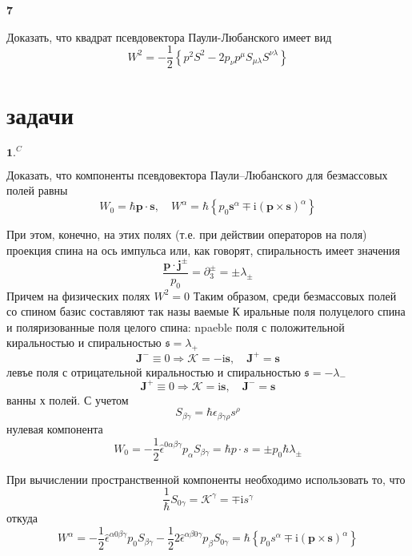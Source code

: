 \documentclass[a4paper,12pt]{article} %
\begin{document}
\begin{task}\textbf{7}

Доказать, что квадрат псевдовектора Паули-Любанского имеет вид
$$
W^{2}=-\frac{1}{2}\left\{p^{2} S^{2}-2 p_{\nu} p^{\mu} S_{\mu \lambda} S^{\nu \lambda}\right\}
$$








\end{task}





\section{задачи}


\begin{ttask}$\mathbf{1.}^{C}$ 

Доказать, что компоненты псевдовектора Паули–Любанского для
безмассовых полей равны
$$
W_{0}=
\hbar \boldsymbol{p} \cdot \boldsymbol{s}, \quad 
W^{\alpha}=
\hbar\left\{p_{0} \boldsymbol{s}^{\alpha} \mp \mathrm{i}(\boldsymbol{p} \times \boldsymbol{s})^{\alpha}\right\}
$$




При этом, конечно, на этих полях (т.е. при действии операторов на поля) проекция спина
на ось импульса или, как говорят, спиральность имеет значения
$$
\frac{\boldsymbol{p} \cdot \boldsymbol{j}^{\pm}}{p_{0}}=\partial_{3}^{\pm}=\pm \lambda_{\pm}
$$
Причем на физических полях $W^{2}=0$ Таким образом, среди безмассовых полей со спином базис составляют так назы ваемые
К иральные поля полуцелого спина и поляризованные поля целого спина:
npaeble поля с положительной киральностью и спиральностью $\mathfrak{s}=\lambda_{+}$
$$
\boldsymbol{J}^{-} \equiv 0 \Rightarrow \mathcal{K}=-\mathrm{i} \boldsymbol{s}, \quad \boldsymbol{J}^{+}=\boldsymbol{s}
$$
левъе поля с отрицательной киральностью и спиральностью $\mathfrak{s}=-\lambda_{-}$
$$
\boldsymbol{J}^{+} \equiv 0 \Rightarrow \mathcal{K}=\mathrm{i} \boldsymbol{s}, \quad \boldsymbol{J}^{-}=\boldsymbol{s}
$$
ванны х полей. С учетом
$$
S_{\beta \gamma}=\hbar \epsilon_{\beta \gamma \rho} s^{\rho}
$$
нулевая компонента
$$
W_{0}=-\frac{1}{2} \hat{\epsilon}^{0 \alpha \beta \gamma} p_{\alpha} S_{\beta \gamma}=\hbar p \cdot s=\pm p_{0} \hbar \lambda_{\pm}
$$

При вычислении пространственной компоненты необходимо использовать то, что
$$
\frac{1}{\hbar} S_{0 \gamma}=\mathcal{K}^{\gamma}=\mp \mathrm{i} s^{\gamma}
$$
откуда
$$
W^{\alpha}=-\frac{1}{2} \hat{\epsilon}^{\alpha 0 \beta \gamma} p_{0} S_{\beta \gamma}-\frac{1}{2} 2 \hat{\epsilon}^{\alpha \beta 0 \gamma} p_{\beta} S_{0 \gamma}=\hbar\left\{p_{0} s^{\alpha} \mp \mathrm{i}(\boldsymbol{p} \times \boldsymbol{s})^{\alpha}\right\}
$$







\end{ttask}
\end{document}
